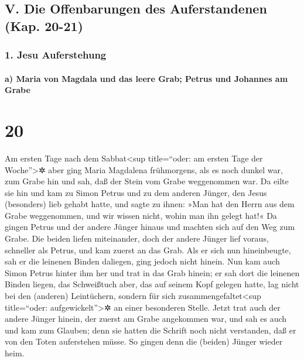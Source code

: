 \hypertarget{v.-die-offenbarungen-des-auferstandenen-kap.-20-21}{%
\subsection{V. Die Offenbarungen des Auferstandenen (Kap.
20-21)}\label{v.-die-offenbarungen-des-auferstandenen-kap.-20-21}}

\hypertarget{jesu-auferstehung}{%
\subsubsection{1. Jesu Auferstehung}\label{jesu-auferstehung}}

\hypertarget{a-maria-von-magdala-und-das-leere-grab-petrus-und-johannes-am-grabe}{%
\paragraph{a) Maria von Magdala und das leere Grab; Petrus und Johannes
am
Grabe}\label{a-maria-von-magdala-und-das-leere-grab-petrus-und-johannes-am-grabe}}

\hypertarget{section-19}{%
\section{20}\label{section-19}}

 Am ersten Tage nach dem Sabbat\textless sup title=``oder:
am ersten Tage der Woche''\textgreater✲ aber ging Maria Magdalena
frühmorgens, als es noch dunkel war, zum Grabe hin und sah, daß der
Stein vom Grabe weggenommen war.  Da eilte sie hin und kam
zu Simon Petrus und zu dem anderen Jünger, den Jesus (besonders) lieb
gehabt hatte, und sagte zu ihnen: »Man hat den Herrn aus dem Grabe
weggenommen, und wir wissen nicht, wohin man ihn gelegt hat!«
 Da gingen Petrus und der andere Jünger hinaus und machten
sich auf den Weg zum Grabe.  Die beiden liefen
miteinander, doch der andere Jünger lief voraus, schneller als Petrus,
und kam zuerst an das Grab.  Als er sich nun hineinbeugte,
sah er die leinenen Binden daliegen, ging jedoch nicht hinein.
 Nun kam auch Simon Petrus hinter ihm her und trat in das
Grab hinein; er sah dort die leinenen Binden liegen,  das
Schweißtuch aber, das auf seinem Kopf gelegen hatte, lag nicht bei den
(anderen) Leintüchern, sondern für sich zusammengefaltet\textless sup
title=``oder: aufgewickelt''\textgreater✲ an einer besonderen Stelle.
 Jetzt trat auch der andere Jünger hinein, der zuerst am
Grabe angekommen war, und sah es auch und kam zum Glauben;
 denn sie hatten die Schrift noch nicht verstanden, daß er
von den Toten auferstehen müsse.  So gingen denn die
(beiden) Jünger wieder heim.

